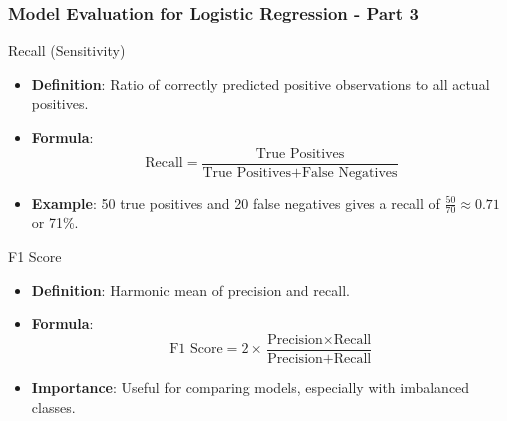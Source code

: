 \documentclass[aspectratio=169]{beamer}
\begin{document}
\begin{frame}[fragile]
    \frametitle{Model Evaluation for Logistic Regression - Part 3}
    
    \begin{block}{Recall (Sensitivity)}
        \begin{itemize}
            \item \textbf{Definition}: Ratio of correctly predicted positive observations to all actual positives.
            \item \textbf{Formula}:
            \begin{equation}
                \text{Recall} = \frac{\text{True Positives}}{\text{True Positives} + \text{False Negatives}}
            \end{equation}
            \item \textbf{Example}: 50 true positives and 20 false negatives gives a recall of \( \frac{50}{70} \approx 0.71 \) or 71\%.
        \end{itemize}
    \end{block}

    \begin{block}{F1 Score}
        \begin{itemize}
            \item \textbf{Definition}: Harmonic mean of precision and recall.
            \item \textbf{Formula}:
            \begin{equation}
                \text{F1 Score} = 2 \times \frac{\text{Precision} \times \text{Recall}}{\text{Precision} + \text{Recall}}
            \end{equation}
            \item \textbf{Importance}: Useful for comparing models, especially with imbalanced classes.
        \end{itemize}
    \end{block}
\end{frame}
\end{document}
